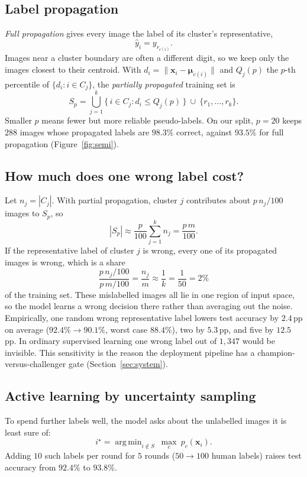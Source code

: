 \documentclass[11pt,a4paper]{article}
\newcommand{\x}{\mathbf{x}}
\newcommand{\vmu}{\boldsymbol{\mu}}
\DeclareMathOperator*{\argmin}{arg\,min}
\begin{document}
\subsection{Label propagation}
\emph{Full propagation} gives every image the label of its cluster's representative,
\begin{equation}
  \hat y_i=y_{r_{c(i)}} .
\end{equation}
Images near a cluster boundary are often a different digit, so we keep only the images closest to their centroid.
With $d_i=\lVert\x_i-\vmu_{c(i)}\rVert$ and $Q_j(p)$ the $p$-th percentile of $\{d_i : i\in C_j\}$, the
\emph{partially propagated} training set is
\begin{equation}
  S_p=\bigcup_{j=1}^{k}\{\,i\in C_j : d_i\le Q_j(p)\,\}\ \cup\ \{r_1,\dots,r_k\}.
\end{equation}
Smaller $p$ means fewer but more reliable pseudo-labels. On our split, $p=20$ keeps $288$ images whose
propagated labels are $98.3\%$ correct, against $93.5\%$ for full propagation (Figure~\ref{fig:semi}).

\subsection{How much does one wrong label cost?}
Let $n_j=|C_j|$. With partial propagation, cluster $j$ contributes about $p\,n_j/100$ images to $S_p$, so
\begin{equation}
  |S_p|\approx\frac{p}{100}\sum_{j=1}^{k}n_j=\frac{p\,m}{100}.
\end{equation}
If the representative label of cluster $j$ is wrong, every one of its propagated images is wrong, which is a share
\begin{equation}
  \frac{p\,n_j/100}{p\,m/100}=\frac{n_j}{m}\approx\frac{1}{k}=\frac{1}{50}=2\%
\end{equation}
of the training set. These mislabelled images all lie in one region of input space, so the model learns a wrong
decision there rather than averaging out the noise. Empirically, one random wrong representative label lowers
test accuracy by $2.4$\,pp on average ($92.4\%\to90.1\%$, worst case $88.4\%$), two by $5.3$\,pp, and five by
$12.5$\,pp. In ordinary supervised learning one wrong label out of $1{,}347$ would be invisible. This
sensitivity is the reason the deployment pipeline has a champion-versus-challenger gate (Section~\ref{sec:system}).

\subsection{Active learning by uncertainty sampling}
To spend further labels well, the model asks about the unlabelled images it is least sure of:
\begin{equation}
  i^\star=\argmin_{i\notin S}\ \max_{c}\ p_c(\x_i).
\end{equation}
Adding $10$ such labels per round for $5$ rounds ($50\to100$ human labels) raises test accuracy from $92.4\%$ to
$93.8\%$.
\end{document}
